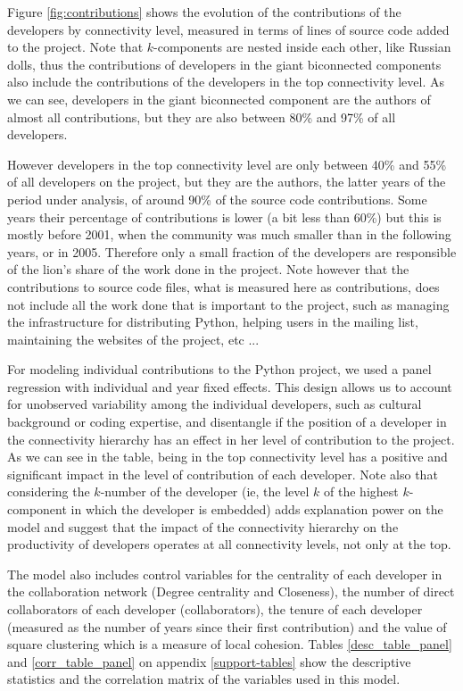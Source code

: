 Figure \ref{fig:contributions} shows the evolution of the contributions of the developers by connectivity level, measured in terms of lines of source code added to the project. Note that $k$-components are nested inside each other, like Russian dolls, thus the contributions of developers in the giant biconnected components also include the contributions of the developers in the top connectivity level. As we can see, developers in the giant biconnected component are the authors of almost all contributions, but they are also between 80\% and 97\% of all developers.

However developers in the top connectivity level are only between 40\% and 55\% of all developers on the project, but they are the authors, the latter years of the period under analysis, of around 90\% of the source code contributions. Some years their percentage of contributions is lower (a bit less than 60\%) but this is mostly before 2001, when the community was much smaller than in the following years, or in 2005. Therefore only a small fraction of the developers are responsible of the lion's share of the work done in the project. Note however that the contributions to source code files, what is measured here as contributions, does not include all the work done that is important to the project, such as managing the infrastructure for distributing Python, helping users in the mailing list, maintaining the websites of the project, etc ... 

For modeling individual contributions to the Python project, we used a panel regression with individual and year fixed effects. This design allows us to account for unobserved variability among the individual developers, such as cultural background or coding expertise, and disentangle if the position of a developer in the connectivity hierarchy has an effect in her level of contribution to the project. As we can see in the table, being in the top connectivity level has a positive and significant impact in the level of contribution of each developer. Note also that considering the $k$-number of the developer (ie, the level $k$ of the highest $k$-component in which the developer is embedded) adds explanation power on the model and suggest that the impact of the connectivity hierarchy on the productivity of developers operates at all connectivity levels, not only at the top.

The model also includes control variables for the centrality of each developer in the collaboration network (Degree centrality and Closeness), the number of direct collaborators of each developer (collaborators), the tenure of each developer (measured as the number of years since their first contribution) and the value of square clustering which is a measure of local cohesion. Tables \ref{desc_table_panel} and \ref{corr_table_panel} on appendix \ref{support-tables} show the descriptive statistics and the correlation matrix of the variables used in this model.

